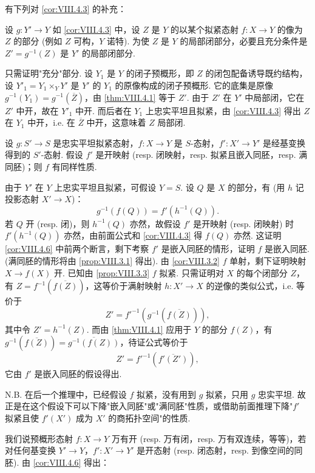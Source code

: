 有下列对 \ref{cor:VIII.4.3} 的补充：

\begin{corollary}\label{cor:VIII.4.5}
设 $g \colon Y' \to Y$ 如 \ref{cor:VIII.4.3} 中，设 $Z$ 是 $Y$ 的以某个拟紧态射 $f \colon X \to Y$ 的像为 $Z$ 的部分 (例如 $Z$ 可构，$Y$ 诺特). 为使 $Z$ 是 $Y$ 的局部闭部分，必要且充分条件是 $Z' = g^{-1}(Z)$ 是 $Y'$ 的局部闭部分.
\end{corollary}

只需证明"充分"部分. 设 $Y_1$ 是 $Y$ 的闭子预概形，即 $Z$ 的闭包配备诱导既约结构，设 $Y'_1 = Y_1 \times_Y Y'$ 是 $Y'$ 的 $Y_1$ 的原像构成的闭子预概形. 它的底集是原像 $g^{-1}(Y_1) = g^{-1}(\overline{Z})$，由 \ref{thm:VIII.4.1} 等于 $Z'$. 由于 $Z'$ 在 $Y'$ 中局部闭，它在 $Z'$ 中开，故在 $Y'_1$ 中开. 而后者在 $Y_1$ 上忠实平坦且拟紧，由 \ref{cor:VIII.4.3} 得出 $Z$ 在 $Y_1$ 中开，i.e. 在 $\overline{Z}$ 中开，这意味着 $Z$ 局部闭.

\begin{corollary}\label{cor:VIII.4.6}
设 $g \colon S' \to S$ 是忠实平坦拟紧态射，$f \colon X \to Y$ 是 $S$-态射，$f' \colon X' \to Y'$ 是经基变换得到的 $S'$-态射. 假设 $f'$ 是开映射 (resp. 闭映射，resp. 拟紧且嵌入同胚，resp. 满同胚)；则 $f$ 有同样性质.
\end{corollary}

由于 $Y'$ 在 $Y$ 上忠实平坦且拟紧，可假设 $Y = S$. 设 $Q$ 是 $X$ 的部分，有 (用 $h$ 记投影态射 $X' \to X$)：
\[
g^{-1}(f(Q)) = f'(h^{-1}(Q)).
\]
若 $Q$ 开 (resp. 闭)，则 $h^{-1}(Q)$ 亦然，故假设 $f'$ 是开映射 (resp. 闭映射) 时 $f'(h^{-1}(Q))$ 亦然，由前面公式和 \ref{cor:VIII.4.3} 得 $f(Q)$ 亦然. 这证明 \ref{cor:VIII.4.6} 中前两个断言，剩下考察 $f'$ 是嵌入同胚的情形，证明 $f$ 是嵌入同胚. (满同胚的情形将由 \ref{prop:VIII.3.1} 得出). 由 \ref{cor:VIII.3.2} $f$ 单射，剩下证明映射 $X \to f(X)$ 开. 已知由 \ref{prop:VIII.3.3} $f$ 拟紧. 只需证明对 $X$ 的每个闭部分 $Z$，有 $Z = f^{-1}(\overline{f(Z)})$，这等价于满射映射 $h \colon X' \to X$ 的逆像的类似公式，i.e. 等价于
\[
Z' = f'^{-1}(g^{-1}(\overline{f(Z)})),
\]
其中令 $Z' = h^{-1}(Z)$. 而由 \ref{thm:VIII.4.1} 应用于 $Y$ 的部分 $f(Z)$，有 $g^{-1}(\overline{f(Z)}) = \overline{g^{-1}(f(Z))}$，待证公式等价于
\[
Z' = f'^{-1}(\overline{f'(Z')}),
\]
它由 $f'$ 是嵌入同胚的假设得出.

N.B. 在后一个推理中，已经假设 $f$ 拟紧，没有用到 $g$ 拟紧，只用 $g$ 忠实平坦. 故正是在这个假设下可以下降"嵌入同胚"或"满同胚"性质，或借助前面推理下降"$f'$ 拟紧且使 $f'(X')$ 成为 $X'$ 的商拓扑空间"的性质.

我们说预概形态射 $f \colon X \to Y$ 万有开 (resp. 万有闭，resp. 万有双连续，等等)，若对任何基变换 $Y' \to Y$，$f' \colon X' \to Y'$ 是开态射 (resp. 闭态射，resp. 到像空间的同胚). 由 \ref{cor:VIII.4.6} 得出：


